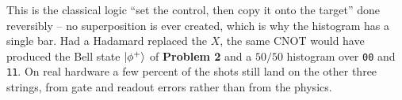 \documentclass[a4paper, 10pt]{article}
\begin{document}
\begin{solution}

	\begin{remark}
		This is the classical logic ``set the control, then copy it onto the target'' done reversibly -- no superposition is ever created, which is why the histogram has a single bar.
		Had a Hadamard replaced the \( X \), the same CNOT would have produced the Bell state \( \ket{\phi^{+}} \) of \textbf{Problem 2} and a \( 50/50 \) histogram over \texttt{00} and \texttt{11}.
		On real hardware a few percent of the shots still land on the other three strings, from gate and readout errors rather than from the physics.
	\end{remark}
\end{solution}



\end{document}
